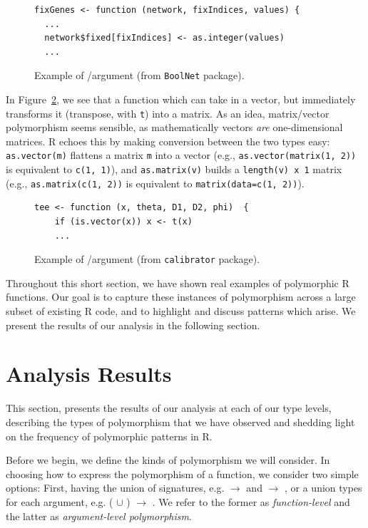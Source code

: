 \documentclass[acmsmall,10pt,review,anonymous]{acmart}\settopmatter{printfolios=true,printccs=false,printacmref=false}
\newcommand{\code}[1]{\lstinline|#1|\xspace}
\begin{document}
\begin{figure}[!hb]{\small\begin{lstlisting}[style=R]
fixGenes <- function (network, fixIndices, values) {
  ...
  network$fixed[fixIndices] <- as.integer(values)
  ...
\end{lstlisting}}\caption{Example of \C/\D argument (from {\tt BoolNet} package).}\label{fig:chardbl}\end{figure}%

In Figure~\ref{fig:matvec}, we see that a function which can take in a vector,
but immediately transforms it (transpose, with {\tt t}) into a matrix.  As
an idea, matrix/vector polymorphism seems sensible, as mathematically
vectors {\it are} one-dimensional matrices.  R echoes this by making conversion between the two
types easy: \code{as.vector(m)} flattens a matrix \code{m} into a vector
(e.g., \code{as.vector(matrix(1, 2))} is equivalent to \code{c(1, 1)}), and
\code{as.matrix(v)} builds a {\tt length(v) x 1} matrix (e.g.,
\code{as.matrix(c(1, 2))} is equivalent to \code{matrix(data=c(1, 2))}). 
  
\begin{figure}[!hb]{\small\begin{lstlisting}[style=R]
tee <- function (x, theta, D1, D2, phi)  {
    if (is.vector(x)) x <- t(x)
    ...
\end{lstlisting}}\caption{Example of /\D argument (from {\tt calibrator} package).}\label{fig:matvec}\end{figure}

Throughout this short section, we have shown real examples of polymorphic R functions.
Our goal is to capture these instances of polymorphism across a large subset of existing R code, and to highlight and discuss patterns which arise.
We present the results of our analysis in the following section.

%
%
%
%
%
%
\section{Analysis Results}\label{sec:results}

This section,  presents the results of our analysis at each of our type levels, describing the types of polymorphism that we have observed and shedding light on the frequency of polymorphic patterns in R.

Before we begin, we define the kinds of polymorphism we will consider.  In
choosing how to express the polymorphism of a function, we consider two
simple options: First, having the union of signatures, e.g. \D $\rightarrow$
\D and \C $\rightarrow$ \D, or a union types for each argument, e.g. (\D
$\cup$ \C) $\rightarrow$ \C.  We refer to the former as {\it function-level}
and the latter as {\it argument-level polymorphism}.
\end{document}

